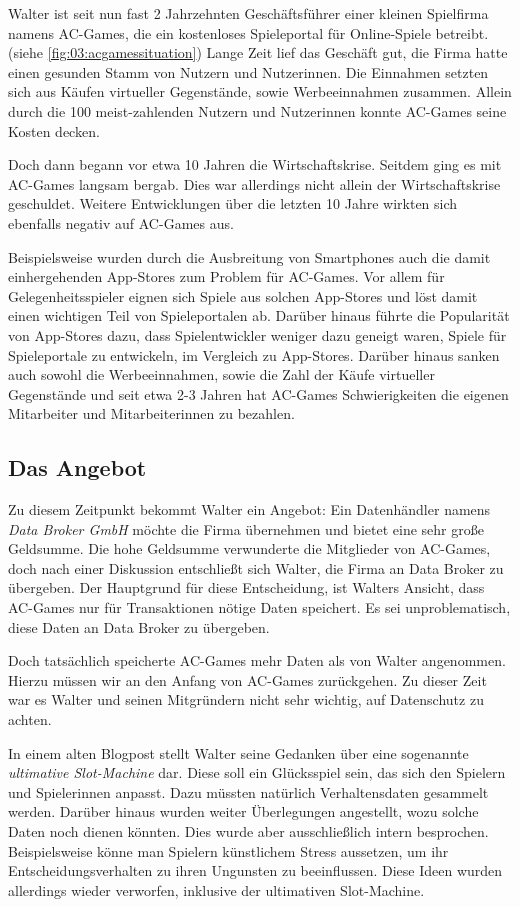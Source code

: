 \documentclass[11pt, a4paper]{scrartcl}
\begin{document}
Walter ist seit nun fast 2 Jahrzehnten Geschäftsführer einer kleinen Spielfirma namens AC-Games, 
die ein kostenloses Spieleportal für Online-Spiele betreibt. (siehe \cref{fig:03:acgamessituation})
Lange Zeit lief das Geschäft gut, die Firma hatte einen gesunden Stamm von Nutzern und Nutzerinnen.
Die Einnahmen setzten sich aus Käufen virtueller Gegenstände, sowie Werbeeinnahmen zusammen.
Allein durch die 100 meist-zahlenden Nutzern und Nutzerinnen konnte AC-Games seine Kosten decken.

Doch dann begann vor etwa 10 Jahren die Wirtschaftskrise. 
Seitdem ging es mit AC-Games langsam bergab.
Dies war allerdings nicht allein der Wirtschaftskrise geschuldet.
Weitere Entwicklungen über die letzten 10 Jahre wirkten sich ebenfalls negativ auf AC-Games aus.

Beispielsweise wurden durch die Ausbreitung von Smartphones auch die damit einhergehenden App-Stores zum Problem für AC-Games.
Vor allem für Gelegenheitsspieler eignen sich Spiele aus solchen App-Stores 
und löst damit einen wichtigen Teil von Spieleportalen ab.
Darüber hinaus führte die Popularität von App-Stores dazu,
dass Spielentwickler weniger dazu geneigt waren, Spiele für Spieleportale zu entwickeln, im Vergleich zu App-Stores.
Darüber hinaus sanken auch sowohl die Werbeeinnahmen, sowie die Zahl der Käufe virtueller Gegenstände
und seit etwa 2-3 Jahren hat AC-Games Schwierigkeiten die eigenen Mitarbeiter und Mitarbeiterinnen zu bezahlen.

\subsection{Das Angebot}

Zu diesem Zeitpunkt bekommt Walter ein Angebot:
Ein Datenhändler namens \emph{Data Broker GmbH} möchte die Firma übernehmen und bietet eine sehr große Geldsumme.
Die hohe Geldsumme verwunderte die Mitglieder von AC-Games,
doch nach einer Diskussion entschließt sich Walter, die Firma an Data Broker zu übergeben.
Der Hauptgrund für diese Entscheidung, ist Walters Ansicht, dass AC-Games nur für Transaktionen nötige Daten speichert.
Es sei unproblematisch, diese Daten an Data Broker zu übergeben.

Doch tatsächlich speicherte AC-Games mehr Daten als von Walter angenommen.
Hierzu müssen wir an den Anfang von AC-Games zurückgehen.
Zu dieser Zeit war es Walter und seinen Mitgründern nicht sehr wichtig, auf Datenschutz zu achten.

In einem alten Blogpost stellt Walter seine Gedanken über eine sogenannte \emph{ultimative Slot-Machine} dar.
Diese soll ein Glücksspiel sein, das sich den Spielern und Spielerinnen anpasst.
Dazu müssten natürlich Verhaltensdaten gesammelt werden.
Darüber hinaus wurden weiter Überlegungen angestellt, wozu solche Daten noch dienen könnten.
Dies wurde aber ausschließlich intern besprochen.
Beispielsweise könne man Spielern künstlichem Stress aussetzen, um ihr Entscheidungsverhalten zu ihren Ungunsten zu beeinflussen.
Diese Ideen wurden allerdings wieder verworfen, inklusive der ultimativen Slot-Machine.
\end{document}
